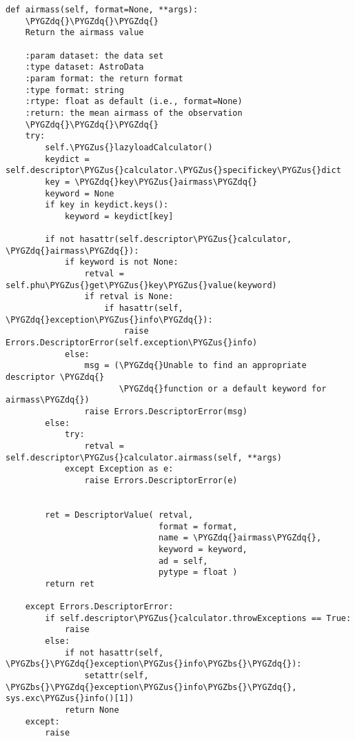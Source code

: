 \documentclass[letterpaper,10pt,english]{sphinxmanual}
\def\PYGZbs{\char`\\}
\def\PYGZus{\char`\_}
\def\PYGZdq{\char`\"}
\begin{document}
\begin{Verbatim}[commandchars=\\\{\}]
def airmass(self, format=None, **args):
    \PYGZdq{}\PYGZdq{}\PYGZdq{}
    Return the airmass value

    :param dataset: the data set
    :type dataset: AstroData
    :param format: the return format
    :type format: string
    :rtype: float as default (i.e., format=None)
    :return: the mean airmass of the observation
    \PYGZdq{}\PYGZdq{}\PYGZdq{}
    try:
        self.\PYGZus{}lazyloadCalculator()
        keydict = self.descriptor\PYGZus{}calculator.\PYGZus{}specifickey\PYGZus{}dict
        key = \PYGZdq{}key\PYGZus{}airmass\PYGZdq{}
        keyword = None
        if key in keydict.keys():
            keyword = keydict[key]

        if not hasattr(self.descriptor\PYGZus{}calculator, \PYGZdq{}airmass\PYGZdq{}):
            if keyword is not None:
                retval = self.phu\PYGZus{}get\PYGZus{}key\PYGZus{}value(keyword)
                if retval is None:
                    if hasattr(self, \PYGZdq{}exception\PYGZus{}info\PYGZdq{}):
                        raise Errors.DescriptorError(self.exception\PYGZus{}info)
            else:
                msg = (\PYGZdq{}Unable to find an appropriate descriptor \PYGZdq{}
                       \PYGZdq{}function or a default keyword for airmass\PYGZdq{})
                raise Errors.DescriptorError(msg)
        else:
            try:
                retval = self.descriptor\PYGZus{}calculator.airmass(self, **args)
            except Exception as e:
                raise Errors.DescriptorError(e)


        ret = DescriptorValue( retval,
                               format = format,
                               name = \PYGZdq{}airmass\PYGZdq{},
                               keyword = keyword,
                               ad = self,
                               pytype = float )
        return ret

    except Errors.DescriptorError:
        if self.descriptor\PYGZus{}calculator.throwExceptions == True:
            raise
        else:
            if not hasattr(self, \PYGZbs{}\PYGZdq{}exception\PYGZus{}info\PYGZbs{}\PYGZdq{}):
                setattr(self, \PYGZbs{}\PYGZdq{}exception\PYGZus{}info\PYGZbs{}\PYGZdq{}, sys.exc\PYGZus{}info()[1])
            return None
    except:
        raise
\end{Verbatim}
\end{document}
